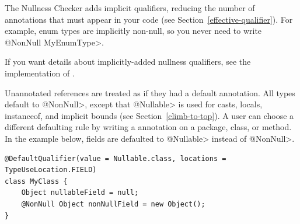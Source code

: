 The Nullness Checker
adds implicit qualifiers, reducing the number of annotations that must
appear in your code (see Section~\ref{effective-qualifier}).
For example, enum types are implicitly non-null, so you never need to write
\<@NonNull MyEnumType>.

If you want details about implicitly-added nullness qualifiers, see the
implementation of .




Unannotated references are treated as if they had a default annotation.
All types default to
\<@NonNull>, except that \<@Nullable> is used for casts, locals,
instanceof, and implicit bounds (see Section~\ref{climb-to-top}).
A user can choose a different defaulting
rule by writing a  annotation on a
 package, class, or method.  In the example below, fields are defaulted to
\<@Nullable> instead of \<@NonNull>.

\begin{Verbatim}
@DefaultQualifier(value = Nullable.class, locations = TypeUseLocation.FIELD)
class MyClass {
    Object nullableField = null;
    @NonNull Object nonNullField = new Object();
}
\end{Verbatim}


